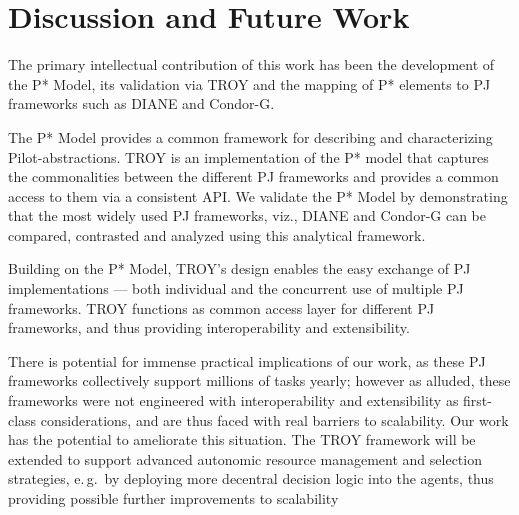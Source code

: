 \documentclass[conference,final]{IEEEtran}
\newcommand{\alnote}[1]{ {\textcolor{blue} { ***andre: #1 }}}
\newcommand{\alnote}[1]{}
\newcommand{\upp}{\vspace*{-0.5em}}
\begin{document}


\section{Discussion and Future Work \upp\upp}
\label{sec:discussion-future-work}



The primary intellectual contribution of this work has been the
development of the P* Model, its validation via TROY and the mapping
of P* elements to PJ frameworks such as DIANE and Condor-G. 
 
The P* Model provides a common framework for describing and
characterizing Pilot-abstractions. TROY is an implementation of the P*
model that captures the commonalities between the different PJ
frameworks and provides a common access to them via a consistent API.
We validate the P* Model by demonstrating that the most widely used PJ
frameworks, viz., DIANE and Condor-G can be compared, contrasted and
analyzed using this analytical
framework.%

Building on the P* Model, TROY's design enables the easy exchange of
PJ implementations --- both individual and the concurrent use of
multiple PJ frameworks. TROY functions as common access layer for
different PJ frameworks, and thus providing interoperability and
extensibility.

There is potential for immense practical implications of our work, as
these PJ frameworks collectively support millions of tasks yearly;
however as alluded, these frameworks were not engineered with
interoperability and extensibility as first-class considerations, and
are thus faced with real barriers to scalability.  Our work has the
potential to ameliorate this situation.  The TROY framework will be
extended to support advanced autonomic resource management and
selection strategies, e.\,g.\ by deploying more decentral decision
logic into the agents, thus providing possible further improvements to
scalability
\end{document}
